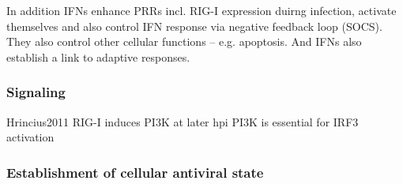 		In addition IFNs enhance PRRs incl. RIG-I expression duirng infection, activate themselves and also control IFN response via negative feedback loop (SOCS). They also control other cellular functions -- e.g. apoptosis. And IFNs also establish a link to adaptive responses.
		
		
		\subsubsection{Signaling}
		
		Hrincius2011
		RIG-I induces PI3K at later hpi
		PI3K is essential for IRF3 activation
		
		
		
		
		
		
		
		
		\subsubsection{Establishment of cellular antiviral state}
		
